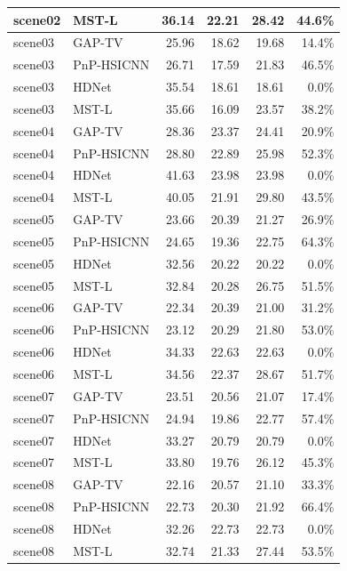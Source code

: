 \documentclass[11pt]{article}
\begin{document}
\begin{footnotesize}
\begin{longtable}{l l r r r r}
scene02 & MST-L         & 36.14 & 22.21 & 28.42 & 44.6\% \\
\midrule
scene03 & GAP-TV        & 25.96 & 18.62 & 19.68 & 14.4\% \\
scene03 & PnP-HSICNN    & 26.71 & 17.59 & 21.83 & 46.5\% \\
scene03 & HDNet         & 35.54 & 18.61 & 18.61 & 0.0\% \\
scene03 & MST-L         & 35.66 & 16.09 & 23.57 & 38.2\% \\
\midrule
scene04 & GAP-TV        & 28.36 & 23.37 & 24.41 & 20.9\% \\
scene04 & PnP-HSICNN    & 28.80 & 22.89 & 25.98 & 52.3\% \\
scene04 & HDNet         & 41.63 & 23.98 & 23.98 & 0.0\% \\
scene04 & MST-L         & 40.05 & 21.91 & 29.80 & 43.5\% \\
\midrule
scene05 & GAP-TV        & 23.66 & 20.39 & 21.27 & 26.9\% \\
scene05 & PnP-HSICNN    & 24.65 & 19.36 & 22.75 & 64.3\% \\
scene05 & HDNet         & 32.56 & 20.22 & 20.22 & 0.0\% \\
scene05 & MST-L         & 32.84 & 20.28 & 26.75 & 51.5\% \\
\midrule
scene06 & GAP-TV        & 22.34 & 20.39 & 21.00 & 31.2\% \\
scene06 & PnP-HSICNN    & 23.12 & 20.29 & 21.80 & 53.0\% \\
scene06 & HDNet         & 34.33 & 22.63 & 22.63 & 0.0\% \\
scene06 & MST-L         & 34.56 & 22.37 & 28.67 & 51.7\% \\
\midrule
scene07 & GAP-TV        & 23.51 & 20.56 & 21.07 & 17.4\% \\
scene07 & PnP-HSICNN    & 24.94 & 19.86 & 22.77 & 57.4\% \\
scene07 & HDNet         & 33.27 & 20.79 & 20.79 & 0.0\% \\
scene07 & MST-L         & 33.80 & 19.76 & 26.12 & 45.3\% \\
\midrule
scene08 & GAP-TV        & 22.16 & 20.57 & 21.10 & 33.3\% \\
scene08 & PnP-HSICNN    & 22.73 & 20.30 & 21.92 & 66.4\% \\
scene08 & HDNet         & 32.26 & 22.73 & 22.73 & 0.0\% \\
scene08 & MST-L         & 32.74 & 21.33 & 27.44 & 53.5\% \\

\end{longtable}
\end{footnotesize}
\end{document}
